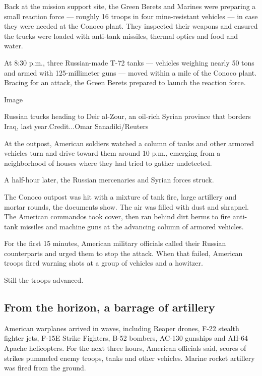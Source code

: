 Back at the mission support site, the Green Berets and Marines were
preparing a small reaction force --- roughly 16 troops in four
mine-resistant vehicles --- in case they were needed at the Conoco
plant. They inspected their weapons and ensured the trucks were loaded
with anti-tank missiles, thermal optics and food and water.

At 8:30 p.m., three Russian-made T-72 tanks --- vehicles weighing nearly
50 tons and armed with 125-millimeter guns --- moved within a mile of
the Conoco plant. Bracing for an attack, the Green Berets prepared to
launch the reaction force.

Image

Russian trucks heading to Deir al-Zour, an oil-rich Syrian province that
borders Iraq, last year.Credit...Omar Sanadiki/Reuters

At the outpost, American soldiers watched a column of tanks and other
armored vehicles turn and drive toward them around 10 p.m., emerging
from a neighborhood of houses where they had tried to gather undetected.

A half-hour later, the Russian mercenaries and Syrian forces struck.

The Conoco outpost was hit with a mixture of tank fire, large artillery
and mortar rounds, the documents show. The air was filled with dust and
shrapnel. The American commandos took cover, then ran behind dirt berms
to fire anti-tank missiles and machine guns at the advancing column of
armored vehicles.

For the first 15 minutes, American military officials called their
Russian counterparts and urged them to stop the attack. When that
failed, American troops fired warning shots at a group of vehicles and a
howitzer.

Still the troops advanced.

\hypertarget{from-the-horizon-a-barrage-of-artillery}{%
\subsection{From the horizon, a barrage of
artillery}\label{from-the-horizon-a-barrage-of-artillery}}

American warplanes arrived in waves, including Reaper drones, F-22
stealth fighter jets, F-15E Strike Fighters, B-52 bombers, AC-130
gunships and AH-64 Apache helicopters. For the next three hours,
American officials said, scores of strikes pummeled enemy troops, tanks
and other vehicles. Marine rocket artillery was fired from the ground.

